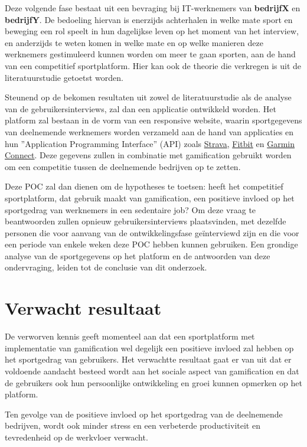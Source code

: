 Deze volgende fase bestaat uit een bevraging bij IT-werknemers van \textbf{bedrijfX} en \textbf{bedrijfY}. De bedoeling hiervan is enerzijds achterhalen in \linebreak welke mate sport en beweging een rol speelt in hun dagelijkse leven op het moment van het interview, en anderzijds te weten komen in welke mate en op welke manieren deze werknemers gestimuleerd kunnen worden om meer te gaan sporten, aan de hand van een competitief sportplatform. Hier kan ook de theorie die verkregen is uit de literatuurstudie getoetst worden.

Steunend op de bekomen resultaten uit zowel de literatuurstudie als de analyse van de gebruikersinterviews, zal dan een applicatie ontwikkeld worden. Het platform zal bestaan in de vorm van een responsive website, waarin sportgegevens van deelnemende werknemers worden verzameld aan de hand van applicaties en hun ''Application Programming Interface'' (API) zoals \linebreak \href{https://developers.strava.com/}{Strava}, \href{https://dev.fitbit.com/}{Fitbit} en \href{https://developer.garmin.com/gc-developer-program/overview/}{Garmin Connect}. Deze gegevens zullen in combinatie met gamification gebruikt worden om een competitie tussen de deelnemende bedrijven op te zetten.

Deze POC zal dan dienen om de hypotheses te toetsen: heeft het competitief sportplatform, dat gebruik maakt van gamification, een positieve invloed op het sportgedrag van werknemers in een sedentaire job? Om deze vraag te beantwoorden zullen opnieuw gebruikersinterviews plaatsvinden, met dezelfde personen die voor aanvang van de ontwikkelingsfase geïnterviewd zijn en die voor een periode van enkele weken deze POC hebben kunnen gebruiken. Een grondige analyse van de sportgegevens op het platform en de antwoorden van deze ondervraging, leiden tot de conclusie van dit onderzoek.


\section{Verwacht resultaat}%
\label{sec:verwachte_resultaten}

De verworven kennis geeft momenteel aan dat een sportplatform met implementatie van gamification wel degelijk een positieve invloed zal hebben op het sportgedrag van gebruikers. Het verwachtte resultaat gaat er van uit dat er voldoende aandacht besteed wordt aan het sociale aspect van gamification en dat de gebruikers ook hun persoonlijke ontwikkeling en groei kunnen opmerken op het platform.

Ten gevolge van de positieve invloed op het sportgedrag van de deelnemende bedrijven, \linebreak wordt ook minder stress en een verbeterde productiviteit en tevredenheid op de werkvloer verwacht.